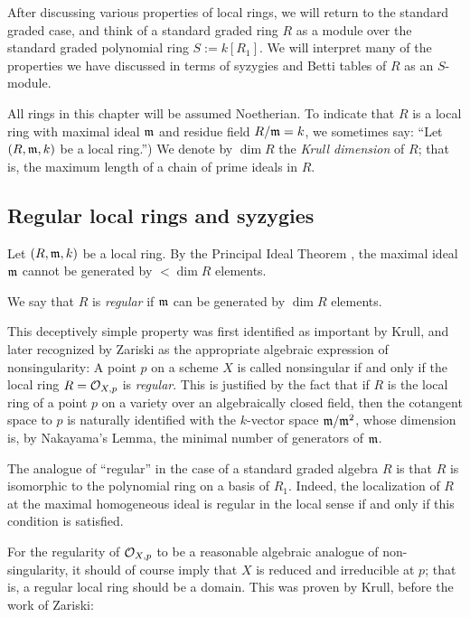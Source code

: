 After discussing various properties of local rings, we will return to the standard graded case, and think of a standard graded ring $R$ as a module over the standard graded polynomial ring $S := k[R_1]$. We will interpret many of the properties we have discussed in terms of syzygies and Betti tables of $R$ as an $S$-module.

All rings in this chapter will be assumed Noetherian. To indicate that $R$ is a local ring with maximal ideal $\gm$ and residue field $R/\gm = k$, we sometimes  say: ``Let $(R,\gm,k)$ be a local ring.'') We denote by $\dim R$ the \emph{Krull dimension} of $R$; that is, the maximum length of a chain of prime ideals in $R$.

\subsection{Regular local rings and syzygies}
Let $(R,\gm,k)$ be a local ring. By the Principal Ideal Theorem \cite[]{E}, the maximal ideal $\gm$ cannot be generated by  $<\dim R$ elements.

\begin{definition}
 We say that $R$ is \emph{regular} if $\gm$ can be generated by $\dim R$ elements.
\end{definition}

This deceptively simple property was first identified as important by Krull, and later recognized by Zariski as the appropriate algebraic expression of nonsingularity: A point $p$ on a scheme $X$ is called nonsingular if and only if the local ring $R = \sO_{X,p}$ is \emph{regular}. This is justified by the fact that if $R$ is the local ring of a point $p$ on a variety over an algebraically closed field, then the cotangent space to $p$ is naturally identified with the 
$k$-vector space $\gm/\gm^{2}$, whose dimension is, by Nakayama's Lemma, the minimal number of generators of $\gm$. 

The analogue of ``regular'' in the case of a standard graded algebra $R$ is that $R$ is isomorphic to the 
polynomial ring on a basis of $R_{1}$. Indeed, the localization of $R$ at the maximal homogeneous ideal is regular in the local sense if and only if this condition is satisfied.

For the regularity of $\sO_{X,p}$ to be a reasonable algebraic analogue of non-singularity, it should of course imply
that $X$ is reduced and irreducible at $p$; that is, a regular local ring should be a domain. This was proven by Krull, before the work of Zariski:

